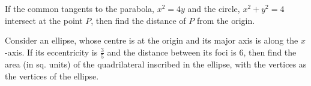 \documentclass[journal,12pt,twocolumn]{IEEEtran}
\begin{document}
%
%
%
\begin{problem}
 If the common tangents to the
parabola, $x^2 = 4y$ and the circle, $x^2 +y^2 = 4$ intersect
at the point $P$, then find the distance of $P$ from the origin.
 \end{problem}
%
%
%
\begin{problem}
Consider an ellipse, whose centre is
at the origin and its major axis is along the $x$-axis.
If its eccentricity is $\frac{3}{5}$ and the distance between
its foci is 6, then find the area (in sq. units) of 
the quadrilateral inscribed in the ellipse, with the
vertices as the vertices of the ellipse.
\end{problem}
\end{document}
